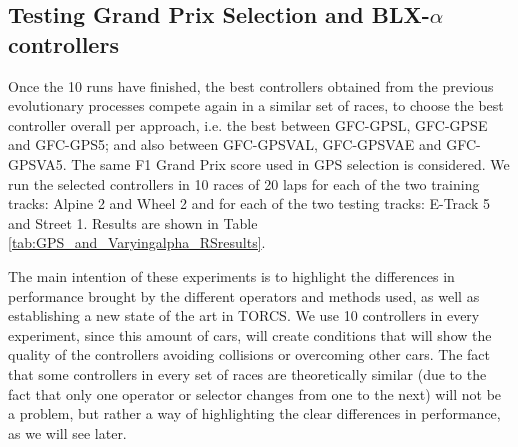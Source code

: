 \documentclass[10pt,journal,compsoc]{IEEEtran}
\begin{document}

\subsection{Testing Grand Prix Selection and BLX-$\alpha$ controllers}

Once the 10 runs have finished, the best controllers obtained from the
previous evolutionary processes compete again in a similar set of
races, to choose the best controller overall per approach,
i.e. the best between {\sf GFC-GPSL}, {\sf GFC-GPSE} and {\sf
  GFC-GPS5}; and also between {\sf GFC-GPSVAL}, {\sf GFC-GPSVAE} and
{\sf GFC-GPSVA5}. The same F1 Grand Prix score used in GPS selection
is considered. We run the selected controllers in 10 races of 20 laps
for each of the two training tracks: Alpine 2  and Wheel 2  and  for
each of the two testing tracks: E-Track 5 and Street 1. Results are
shown in Table \ref{tab:GPS_and_Varyingalpha_RSresults}.

The main intention of these experiments is to
  highlight the differences in performance brought by the different
  operators and methods used, as well as establishing a new state of
  the art in TORCS. We use 10 controllers in every experiment, since
  this amount of cars, will create conditions that will show the
  quality of the controllers avoiding collisions or overcoming other
  cars. The fact that some controllers in every set of races are theoretically similar (due to the fact that only one operator or selector changes from one to the next) will not be a problem, but rather a way of highlighting the clear differences in
  performance, as we will see later.
\end{document}
